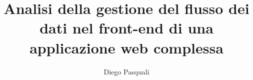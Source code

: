 \documentclass{report}
\author{Diego Pasquali}
\title{Analisi della gestione del flusso dei dati nel front-end di una applicazione web complessa}
\begin{document}
    \maketitle
    \pagebreak

    \tableofcontents
    \pagebreak

    

     
    
\end{document}
